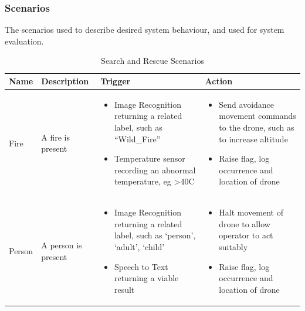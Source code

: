 \documentclass{article}
\begin{document}
\subsubsection{Scenarios}
The scenarios used to describe desired system behaviour, and used for system evaluation.
\begin{table}[H]
\caption{Search and Rescue Scenarios\label{scenarios}}
\hyphenchar{}
\centering
\begin{tabularx}{\textwidth}{| >{\centering}m{1.5cm} | >{\centering}m{2cm} | X | X |}
    \hline
    Name & Description & Trigger & Action \\ \hline
    Fire & \vspace{\baselineskip} A fire is present &
    \begin{itemize}[topsep=0pt, leftmargin=0cm,itemindent=.5cm,labelwidth=\itemindent,labelsep=0cm,align=left]
        \item Image Recognition returning a related label, such as “Wild\_Fire”
        \item Temperature sensor recording an abnormal temperature, eg >40C
    \end{itemize} &
    \begin{itemize} [topsep=0pt, leftmargin=0cm,itemindent=.5cm,labelwidth=\itemindent,labelsep=0cm,align=left]
        \item Send avoidance movement commands to the drone, such as to increase altitude
        \item Raise flag, log occurrence and location of drone
    \end{itemize} \\ \hline

    Person & \vspace{\baselineskip} A person is present &
    \begin{itemize} [topsep=0pt, leftmargin=0cm,itemindent=.5cm,labelwidth=\itemindent,labelsep=0cm,align=left]
        \item Image Recognition returning a related label, such as `person', `adult', `child'
        \item Speech to Text returning a viable result
    \end{itemize} &
    \begin{itemize} [topsep=0pt, leftmargin=0cm,itemindent=.5cm,labelwidth=\itemindent,labelsep=0cm,align=left]
        \item Halt movement of drone to allow operator to act suitably
        \item Raise flag, log occurrence and location of drone
    \end{itemize} \\ \hline


\end{tabularx}
\end{table}
\end{document}
